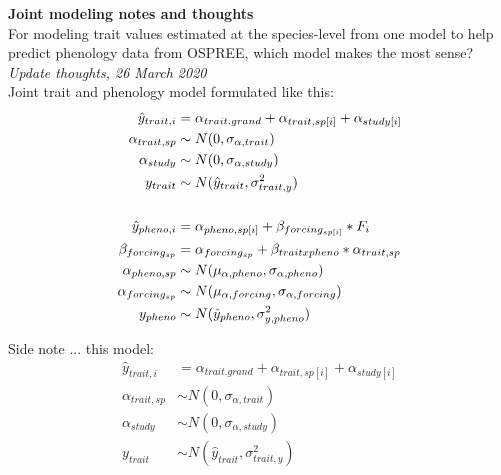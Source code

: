 \documentclass[11pt,letter]{article}
\begin{document}

\renewcommand{\refname}{\CHead{}}

{\bf Joint modeling notes and thoughts}\\


For modeling trait values estimated at the species-level from one model to help predict phenology data from OSPREE, which model makes the most sense?\\

\emph{Update thoughts, 26 March 2020}\\

Joint trait and phenology model formulated like this:
\begin{align*}
\hat{y}_{trait, i} &= \alpha_{trait.grand} + \alpha_{trait, sp[i]} + \alpha_{study[i]}\\
\alpha_{trait, sp} & \sim N(0, \sigma_{\alpha, trait}) \\
\alpha_{study}  & \sim N(0, \sigma_{\alpha, study})\\
y_{trait}& \sim N(\hat{y}_{trait},\sigma^2_{trait, y}) \\
\vspace{1ex}\\
\hat{y}_{pheno, i} &= \alpha_{pheno, sp[i]} + \beta_{forcing_{sp[i]}}*F_i \\
\beta_{forcing_{sp}} & = \alpha_{forcing_{sp}} + \beta_{trait x pheno}*\alpha_{trait, sp} \\
\alpha_{pheno, sp} & \sim N(\mu_{\alpha, pheno}, \sigma_{\alpha, pheno}) \\
\alpha_{forcing_{sp}} & \sim N(\mu_{\alpha, forcing}, \sigma_{\alpha, forcing})\\
y_{pheno} & \sim N(\hat{y}_{pheno},\sigma^2_{y, pheno}) 
\end{align*}

\vspace{5ex}
Side note ... this model:
\begin{align*}
\hat{y}_{trait, i} &= \alpha_{trait.grand} + \alpha_{trait, sp[i]} + \alpha_{study[i]}\\
\alpha_{trait, sp} & \sim N(0, \sigma_{\alpha, trait}) \\
\alpha_{study}  & \sim N(0, \sigma_{\alpha, study})\\
y_{trait}& \sim N(\hat{y}_{trait},\sigma^2_{trait, y}) \\
\end{align*}
\end{document}
